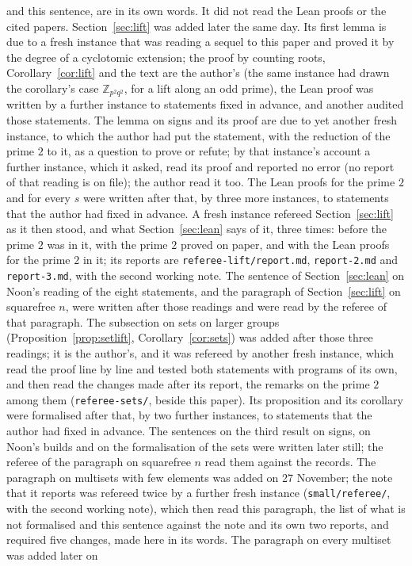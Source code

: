 \documentclass[11pt,a4paper]{amsart}
\theoremstyle{definition}
\theoremstyle{remark}
\newcommand{\Z}{\mathbb{Z}}
\begin{document}
{{and this sentence, are in its own words. It did not read the Lean proofs or the cited papers. Section~\ref{sec:lift} was added later the same day. Its first lemma is due to a fresh instance that was reading a sequel to this paper and proved it by the degree of a cyclotomic extension; the proof by counting roots, Corollary~\ref{cor:lift} and the text are the author's (the same instance had drawn the corollary's case $\Z_{p^2q^2}$, for a lift along an odd prime), the Lean proof was written by a further instance to statements fixed in advance, and another audited those statements. The lemma on signs and its proof are due to yet another fresh instance, to which the author had put the statement, with the reduction of the prime $2$ to it, as a question to prove or refute; by that instance's account a further instance, which it asked, read its proof and reported no error (no report of that reading is on file); the author read it too. The Lean proofs for the prime $2$ and for every $s$ were written after that, by three more instances, to statements that the author had fixed in advance.  A fresh instance refereed Section~\ref{sec:lift} as it then stood, and what Section~\ref{sec:lean} says of it, three times: before the prime $2$ was in it, with the prime $2$ proved on paper, and with the Lean proofs for the prime $2$ in it; its reports are \texttt{referee-lift/report.md}, \texttt{report-2.md} and \texttt{report-3.md}, with the second working note. The sentence of Section~\ref{sec:lean} on Noon's reading of the eight statements, and the paragraph of Section~\ref{sec:lift} on squarefree $n$, were written after those readings and were read by the referee of that paragraph. The subsection on sets on larger groups (Proposition~\ref{prop:setlift}, Corollary~\ref{cor:sets}) was added after those three readings; it is the author's, and it was refereed by another fresh instance, which read the proof line by line and tested both statements with programs of its own, and then read the changes made after its report, the remarks on the prime $2$ among them (\texttt{referee-sets/}, beside this paper). Its proposition and its corollary were formalised after that, by two further instances, to statements that the author had fixed in advance. The sentences on the third result on signs, on Noon's builds and on the formalisation of the sets were written later still; the referee of the paragraph on squarefree $n$ read them against the records. The paragraph on multisets with few elements was added on 27 November; the note that it reports was refereed twice by a further fresh instance (\texttt{small/referee/}, with the second working note), which then read this paragraph, the list of what is not formalised and this sentence against the note and its own two reports, and required five changes, made here in its words. The paragraph on every multiset was added later on
}}
\end{document}
